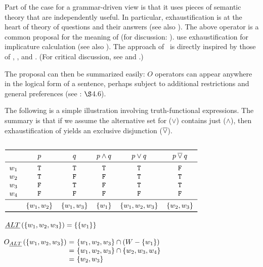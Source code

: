 \documentclass{article}
\begin{document}
\begin{examples}
\item Part of the case for a grammar-driven view is that it uses
  pieces of semantic theory that are independently useful. In
  particular, exhaustification is at the heart of
   theory of questions and their answers (see
  also \citealt{JohnMcCarthy80}). The above operator is a common
  proposal for the meaning of  (for discussion:
  \citealt{Rooth96,Buring01,BeaverClark08}).  \citet{SchulzVanRooij06}
  use exhaustification for implicature calculation (see also
  \citealt{deJagerVanRooij07}). The approach of \CFS\ is directly
  inspired by those of \citet{Sauerland01}, \citet{Spector:2007}, and
  \citet{Fox:2007,Fox:2009}.  (For critical discussion, see
  \citealt{Alonso-Ovalle:2008} and \citealt{Gajewski:2012}.)

\item The proposal can then be summarized easily: $O$ operators can
  appear anywhere in the logical form of a sentence, perhaps subject
  to additional restrictions and general preferences (see \CFS:
  $\S$4.6).

\item\label{or} The following is a simple illustration involving
  truth-functional expressions. The summary is that if we assume the
  alternative set for  ($\vee$) contains just 
  ($\wedge$), then exhaustification of  yields an exclusive
  disjunction ($\mathbin{\overline{\vee}}$).

  \begin{examples}
  \item\label{or-table}
    $\setlength{\arraycolsep}{6pt}
    \begin{array}[t]{ r  *{5}{c } c }
      \toprule
      &  p      & q      & p \wedge q & p \vee q & p \evee q \\
      \midrule
      w_{1} &  \True  & \True  & \True      & \True    & \False   \\
      w_{2} &  \True  & \False & \False     & \True   & \True    \\
      w_{3} &  \False & \True  & \False     & \True   & \True    \\
      w_{4} &  \False & \False & \False     & \False   & \False   \\\midrule
      &  \{w_{1},w_{2}\} &  \{w_{1},w_{3}\} &  \{w_{1}\} & \{w_{1},w_{2},w_{3}\} & \{w_{2},w_{3}\} \\
      \bottomrule
    \end{array}$
  \item\label{or-alt} $\emph{ALT}\left(\left\{ w_{1},w_{2},w_{3} \right\}\right) = \left\{ \left\{ w_{1} \right\} \right\}$
  \item\label{or-final} 
    \renewcommand{\arraystretch}{1.1}
    $\mspace{-12mu}\begin{array}[t]{r@{ \ = \ } l} 
      O_{\ALT}\left(\set{w_{1},w_{2},w_{3}}\right)
      & \set{w_{1},w_{2},w_{3}} \cap \left(W-\set{w_{1}}\right) \\
      & \set{w_{1},w_{2},w_{3}} \cap \set{w_{2},w_{3},w_{4}} \\
      & \set{w_{2},w_{3}}
    \end{array}$
  \end{examples}
  

\end{examples}
\end{document}
